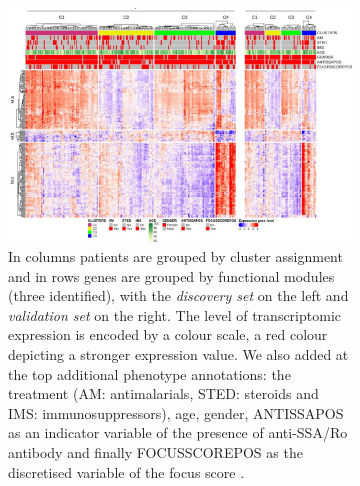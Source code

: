 \documentclass[mainlanguage=english,numlaboratories=2, nofrontcover=true,noaim=false, localbibs, colophon-location=verso-frontcover, oneside, 10pt, localtocs, version=final, nomakeabstract=true]{yathesis}
\begin{document}
{\begin{figure}
\begin{subfigure}[p]{0.35\textwidth}
         \label{subfig:consensus-clustering}
     \end{subfigure}
     \vfill
     \begin{subfigure}[p]{0.6\textwidth}
         \centering
         \includegraphics[width=\textwidth]{figures/sjogren/heatmap_sjogren.png}
         \caption[Heatmap performed for 304 pSS patients (Discovery set: 227, Validation set: 77) showing the distribution of gene transcripts.]{ In columns patients are grouped by cluster assignment and in rows genes are grouped by functional modules (three identified), with the \emph{discovery set} on the left and \emph{validation set} on the right. 
         The level of transcriptomic expression is encoded by a colour scale, a red colour depicting a stronger expression value. We also added at the top additional phenotype annotations: the treatment (AM: antimalarials, STED: steroids and IMS: immunosuppressors), age, gender, ANTISSAPOS as an indicator variable of the presence of anti-SSA/Ro antibody and finally FOCUSSCOREPOS as the discretised variable of the focus score \autocite{liao_etal22}.}
         \label{subfig:heatmap-sjogren}
     \end{subfigure}        
    \hfill
     \begin{subfigure}[p]{0.35\textwidth}
         \centering

\end{subfigure}
\end{figure}}
\end{document}

